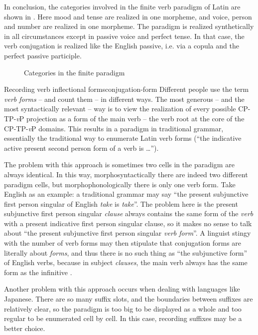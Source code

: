 \documentclass[a4paper, oneside]{report}
\newcommand*{\citepage}[1]{p.~{#1}}
\newcommand*{\term}[1]{\emph{#1}}
\newcommand{\form}[1]{\emph{#1}}
\newcommand{\vP}{\textit{v}P}
\begin{document}
In conclusion, the categories involved in the finite verb paradigm of Latin 
are shown in .
Here mood and tense are realized in one morpheme,
and voice, person and number are realized in one morpheme.
The paradigm is realized synthetically in all circumstances 
except in passive voice and perfect tense.
In that case, the verb conjugation is realized like the English passive,
i.e. via a copula and the perfect passive participle.

\begin{figure}[H]
    \centering
    
    \caption{Categories in the finite paradigm}
    \label{fig:paradigm-finite-verb}
\end{figure}

\begin{infobox}{Recording verb inflectional forms}{conjugation-form}
    Different people use the term \term{verb forms} -- and count them -- in different ways.
    The most generous -- and the most syntactically relevant -- way 
    is to view the realization of every possible CP-TP-\vP{} projection 
    as a form of the main verb -- the verb root at the core of the CP-TP-\vP{} domains.
    This results in a paradigm in traditional grammar, 
    essentially the traditional way to enumerate Latin verb forms 
    (``the indicative active present second person form of a verb is \dots'').

    The problem with this approach is sometimes two cells in the paradigm are always identical.
    In this way, morphosyntactically there are indeed two different paradigm cells,
    but morphophonologically there is only one verb form.
    Take English as an example: 
    a traditional grammar may say 
    ``the present subjunctive first person singular of English \form{take} is \form{take}''. 
    The problem here is the present subjunctive first person singular \emph{clause}
    always contains the same form of the \emph{verb}
    with a present indicative first person singular clause,
    so it makes no sense to talk about ``the present subjunctive first person singular \emph{verb form}''.
    A linguist stingy with the number of verb forms 
    may then stipulate that conjugation forms are literally about \emph{forms},
    and thus there is no such thing as ``the subjunctive form'' of English verbs,
    because in subject \emph{clauses}, 
    the main verb always has the same form as the infinitive
    \citep[\citepage{76}]{cgel}.

    Another problem with this approach occurs 
    when dealing with languages like Japanese.
    There are so many suffix slots,
    and the boundaries between suffixes are relatively clear,
    so the paradigm is too big to be displayed as a whole
    and too regular to be enumerated cell by cell.
    In this case, recording suffixes may be a better choice.


\end{infobox}
\end{document}
